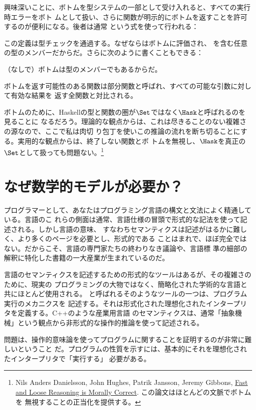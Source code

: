 興味深いことに、ボトムを型システムの一部として受け入れると、すべての実行時エラーをボト
ムとして扱い、さらに関数が明示的にボトムを返すことを許可するのが便利になる。後者は通常
という式を使って行われる：

この定義は型チェックを通過する。なぜならはボトムに評価され、
を含む任意の型のメンバーだからだ。さらに次のように書くこともできる：

（なしで）ボトムは型のメンバーでもあるからだ。

ボトムを返す可能性のある関数は部分関数と呼ばれ、すべての可能な引数に対して有効な結果を
返す全関数と対比される。

ボトムのために、Haskellの型と関数の圏が$\Set$ではなく$\Hask$と呼ばれるのを見ることに
なるだろう。理論的な観点からは、これは尽きることのない複雑さの源なので、ここで私は肉切
り包丁を使いこの推論の流れを断ち切ることにする。実用的な観点からは、終了しない関数とボ
トムを無視し、$\Hask$を真正の$\Set$として扱っても問題ない。\footnote{Nils Anders
  Danielsson, John Hughes, Patrik Jansson, Jeremy Gibbons, \href{http://www.cs.ox.ac.uk/jeremy.gibbons/publications/fast+loose.pdf}{
    Fast and Loose Reasoning is Morally Correct}. この論文はほとんどの文脈でボトムを
  無視することの正当化を提供する。}

\section{なぜ数学的モデルが必要か？}

プログラマーとして、あなたはプログラミング言語の構文と文法によく精通している。言語のこ
れらの側面は通常、言語仕様の冒頭で形式的な記法を使って記述される。しかし言語の意味、
すなわちセマンティクスは記述がはるかに難しく、より多くのページを必要とし、形式的である
ことはまれで、ほぼ完全ではない。だからこそ、言語の専門家たちの終わりなき議論や、言語標
準の細部の解釈に特化した書籍の一大産業が生まれているのだ。

言語のセマンティクスを記述するための形式的なツールはあるが、その複雑さのために、現実の
プログラミングの大物ではなく、簡略化された学術的な言語と共にほとんど使用される。
と呼ばれるそのようなツールの一つは、プログラム実行のメカニクスを
記述する。それは形式化された理想化されたインタープリタを定義する。C++のような産業用言語
のセマンティクスは、通常「抽象機械」という観点から非形式的な操作的推論を使って記述される。

問題は、操作的意味論を使ってプログラムに関することを証明するのが非常に難しいということ
だ。プログラムの性質を示すには、基本的にそれを理想化されたインタープリタで「実行する」
必要がある。

